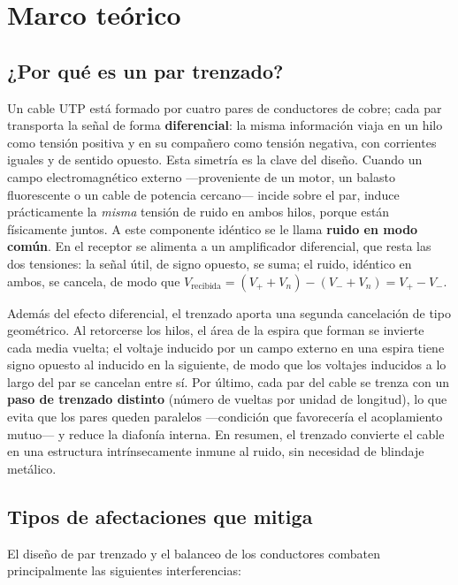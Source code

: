 \documentclass[11pt,a4paper]{article}
\begin{document}
\section{Marco teórico}

\subsection{¿Por qué es un par trenzado?}

Un cable UTP está formado por cuatro pares de conductores de cobre;
cada par transporta la señal de forma \textbf{diferencial}: la misma
información viaja en un hilo como tensión positiva y en su compañero como
tensión negativa, con corrientes iguales y de sentido opuesto. Esta simetría
es la clave del diseño. Cuando un campo electromagnético externo —proveniente
de un motor, un balasto fluorescente o un cable de potencia cercano— incide
sobre el par, induce prácticamente la \emph{misma} tensión de ruido en ambos
hilos, porque están físicamente juntos. A este componente idéntico se le llama
\textbf{ruido en modo común}. En el receptor se alimenta a un amplificador
diferencial, que resta las dos tensiones: la señal útil, de signo opuesto, se
suma; el ruido, idéntico en ambos, se cancela, de modo que
$V_{\text{recibida}} = (V_{+} + V_{n}) - (V_{-} + V_{n}) = V_{+} - V_{-}$.

Además del efecto diferencial, el trenzado aporta una segunda cancelación de
tipo geométrico. Al retorcerse los hilos, el área de la espira que forman se
invierte cada media vuelta; el voltaje inducido por un campo externo en una
espira tiene signo opuesto al inducido en la siguiente, de modo que los
voltajes inducidos a lo largo del par se cancelan entre sí. Por último, cada
par del cable se trenza con un \textbf{paso de trenzado distinto} (número de
vueltas por unidad de longitud), lo que evita que los pares queden paralelos
—condición que favorecería el acoplamiento mutuo— y reduce la diafonía
interna. En resumen, el trenzado convierte el cable en una estructura
intrínsecamente inmune al ruido, sin necesidad de blindaje metálico.

\subsection{Tipos de afectaciones que mitiga}

El diseño de par trenzado y el balanceo de los conductores combaten
principalmente las siguientes interferencias:
\end{document}
